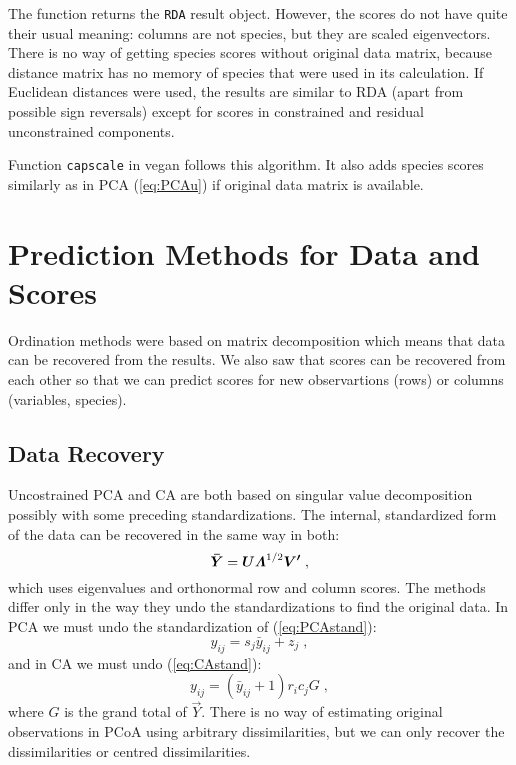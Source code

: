 The function returns the \texttt{RDA} result object. However, the
scores do not have quite their usual meaning: columns are not species,
but they are scaled eigenvectors. There is no way of getting species
scores without original data matrix, because distance matrix has no
memory of species that were used in its calculation.  If Euclidean
distances were used, the results are similar to RDA (apart from
possible sign reversals) except for scores  in constrained and
residual unconstrained components.

Function \texttt{capscale} in vegan follows this algorithm. It also
adds species scores similarly as in PCA (\ref{eq:PCAu}) if original
data matrix  is available.


\section{Prediction Methods for Data and Scores}

Ordination methods were based on matrix decomposition which means that
data can be recovered from the results. We also saw that scores can be
recovered from each other so that we can predict scores for new
observartions (rows) or columns (variables, species).

\subsection{Data Recovery}

Uncostrained PCA and CA are both based on singular value decomposition
possibly with some preceding standardizations. The internal,
standardized form of the data  can be recovered in the
same way in both:
\begin{equation}
  \label{eq:databack}
  \vec{\bar Y} = \vec{U} \bLambda^{1/2} \vec{V'}\;,
\end{equation}
which uses eigenvalues \vec{\bLambda} and orthonormal row and column
scores.  The methods differ only in the way they undo the
standardizations to find the original data. In PCA we must undo the
standardization of (\ref{eq:PCAstand}):
\begin{equation}
  y_{ij} = s_j \bar{y}_{ij} + z_j\;,
\end{equation}
and in CA we must undo (\ref{eq:CAstand}):
\begin{equation}
  y_{ij} = (\bar{y}_{ij} + 1) r_i c_j G\;,
\end{equation}
where $G$ is the grand total of $\vec{Y}$. There is no way of
estimating original observations  in PCoA using arbitrary
dissimilarities, but we can only recover the dissimilarities or
centred dissimilarities.

